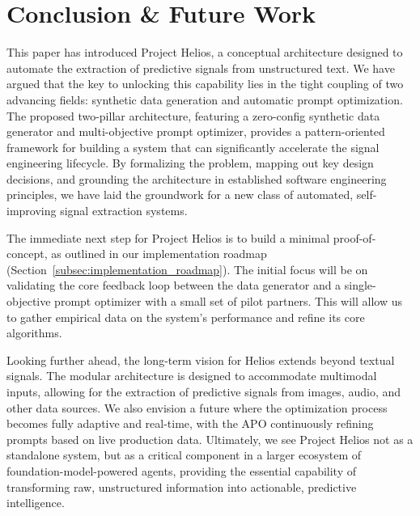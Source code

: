 \documentclass{article}
\begin{document}
\section{Conclusion \& Future Work}
\label{sec:conclusion}
This paper has introduced Project Helios, a conceptual architecture designed to automate the extraction of predictive signals from unstructured text. We have argued that the key to unlocking this capability lies in the tight coupling of two advancing fields: synthetic data generation and automatic prompt optimization. The proposed two-pillar architecture, featuring a zero-config synthetic data generator and multi-objective prompt optimizer, provides a pattern-oriented framework for building a system that can significantly accelerate the signal engineering lifecycle. By formalizing the problem, mapping out key design decisions, and grounding the architecture in established software engineering principles, we have laid the groundwork for a new class of automated, self-improving signal extraction systems.

The immediate next step for Project Helios is to build a minimal proof-of-concept, as outlined in our implementation roadmap (Section~\ref{subsec:implementation_roadmap}). The initial focus will be on validating the core feedback loop between the data generator and a single-objective prompt optimizer with a small set of pilot partners. This will allow us to gather empirical data on the system's performance and refine its core algorithms.

Looking further ahead, the long-term vision for Helios extends beyond textual signals. The modular architecture is designed to accommodate multimodal inputs, allowing for the extraction of predictive signals from images, audio, and other data sources. We also envision a future where the optimization process becomes fully adaptive and real-time, with the APO continuously refining prompts based on live production data. Ultimately, we see Project Helios not as a standalone system, but as a critical component in a larger ecosystem of foundation-model-powered agents, providing the essential capability of transforming raw, unstructured information into actionable, predictive intelligence.

\newpage



\newpage
\appendix
\end{document}
